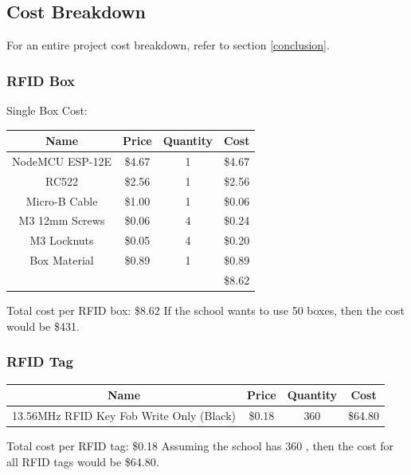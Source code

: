 \documentclass[12pt]{article}
\begin{document}
\begin{spacing}{1.2}
\subsection{Cost Breakdown}
For an entire project cost breakdown, refer to section \ref{conclusion}.

\subsubsection{RFID Box}

Single Box Cost:
\begin{center}
\begin{tabular}{ |c c c c|}

\hline
Name & Price & Quantity & Cost\\
\hline \hline
NodeMCU ESP-12E & \$4.67 & 1 & \$4.67 \\
\hline
RC522 & \$2.56 & 1 & \$2.56 \\
\hline
Micro-B Cable & \$1.00 & 1 & \$0.06 \\ 
\hline
M3 12mm Screws & \$0.06 & 4 & \$0.24 \\ 
\hline
M3 Locknuts & \$0.05 & 4 & \$0.20 \\ 
\hline
Box Material & \$0.89 & 1 & \$0.89 \\
\hline
&&&\$8.62 \\
\hline
\end{tabular}
\end{center}

Total cost per RFID box: \$8.62
\newline
If the school wants to use 50 boxes, then the cost would be \$431.

\subsubsection{RFID Tag}

\label{RFIDTagsCost}
\begin{center}
\begin{tabular}{ |c | c | c | c| }

\hline
Name & Price & Quantity & Cost\\
\hline \hline
13.56MHz  RFID Key Fob Write Only (Black) & \$0.18 & 360 & \$64.80 \\
\hline
\end{tabular}
\end{center}

Total cost per RFID tag: \$0.18
\newline
Assuming the school has 360 , then the cost for all RFID tags would be \$64.80.


\end{spacing}
\end{document}
